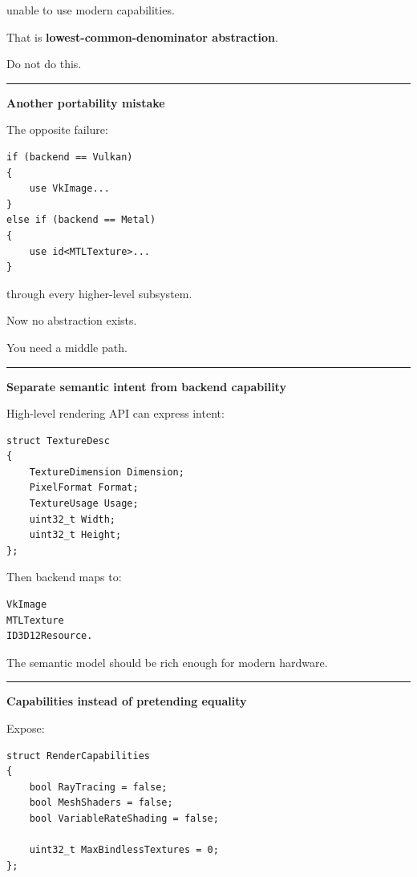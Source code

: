 unable to use modern capabilities.

That is \textbf{lowest-common-denominator abstraction}.

Do not do this.

\begin{center}\rule{0.5\linewidth}{0.5pt}\end{center}

\textbf{Another portability mistake}

The opposite failure:

\begin{verbatim}
if (backend == Vulkan)
{
    use VkImage...
}
else if (backend == Metal)
{
    use id<MTLTexture>...
}
\end{verbatim}

through every higher-level subsystem.

Now no abstraction exists.

You need a middle path.

\begin{center}\rule{0.5\linewidth}{0.5pt}\end{center}

\textbf{Separate semantic intent from backend capability}

High-level rendering API can express intent:

\begin{verbatim}
struct TextureDesc
{
    TextureDimension Dimension;
    PixelFormat Format;
    TextureUsage Usage;
    uint32_t Width;
    uint32_t Height;
};
\end{verbatim}

Then backend maps to:

\begin{verbatim}
VkImage
MTLTexture
ID3D12Resource.
\end{verbatim}

The semantic model should be rich enough for modern hardware.

\begin{center}\rule{0.5\linewidth}{0.5pt}\end{center}

\textbf{Capabilities instead of pretending equality}

Expose:

\begin{verbatim}
struct RenderCapabilities
{
    bool RayTracing = false;
    bool MeshShaders = false;
    bool VariableRateShading = false;

    uint32_t MaxBindlessTextures = 0;
};
\end{verbatim}

